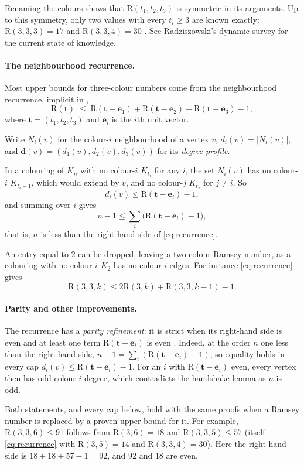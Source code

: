 \documentclass[11pt]{article}
\theoremstyle{spacedplain}
\theoremstyle{spaceddef}
\theoremstyle{spacedremark}
\newcommand{\R}{\mathrm{R}}
\newcommand{\bt}{\mathbf{t}}
\newcommand{\e}{\mathbf{e}}
\begin{document}
Renaming the colours shows that $\R(t_1,t_2,t_3)$ is symmetric in its arguments.
Up to this symmetry, only two values with every $t_i\ge 3$ are known exactly: $\R(3,3,3)=17$ \cite{GG55} and $\R(3,3,4)=30$ \cite{CFIM16}.
See Radziszowski's dynamic survey \cite{Rad26} for the current state of knowledge.

\paragraph{The neighbourhood recurrence.}
Most upper bounds for three-colour numbers come from the neighbourhood recurrence, implicit in \cite{GG55},
\begin{equation}\label{eq:recurrence}
\R(\bt)\;\le\;\R(\bt-\e_1)+\R(\bt-\e_2)+\R(\bt-\e_3)-1,
\end{equation}
where $\bt=(t_1,t_2,t_3)$ and $\e_i$ is the $i$th unit vector.

Write $N_i(v)$ for the colour-$i$ neighbourhood of a vertex $v$, $d_i(v)=|N_i(v)|$, and $\mathbf d(v)=(d_1(v),d_2(v),d_3(v))$ for its \emph{degree profile}.

In a colouring of $K_n$ with no colour-$i$ $K_{t_i}$ for any $i$, the set $N_i(v)$ has no colour-$i$ $K_{t_i-1}$, which would extend by $v$, and no colour-$j$ $K_{t_j}$ for $j\ne i$.
So
\[
d_i(v)\le\R(\bt-\e_i)-1,
\]
and summing over $i$ gives
\[
n-1\le\sum_i\big(\R(\bt-\e_i)-1\big),
\]
that is, $n$ is less than the right-hand side of \eqref{eq:recurrence}.

An entry equal to $2$ can be dropped, leaving a two-colour Ramsey number, as a colouring with no colour-$i$ $K_2$ has no colour-$i$ edges.
For instance \eqref{eq:recurrence} gives
\[
\R(3,3,k)\le 2\R(3,k)+\R(3,3,k-1)-1.
\]

\paragraph{Parity and other improvements.}
The recurrence has a \emph{parity refinement}: it is strict when its right-hand side is even and at least one term $\R(\bt-\e_i)$ is even \cite[6.1(a)]{Rad26}.
Indeed, at the order $n$ one less than the right-hand side, $n-1=\sum_i(\R(\bt-\e_i)-1)$, so equality holds in every cap $d_i(v)\le\R(\bt-\e_i)-1$.
For an $i$ with $\R(\bt-\e_i)$ even, every vertex then has odd colour-$i$ degree, which contradicts the handshake lemma as $n$ is odd.

Both statements, and every cap below, hold with the same proofs when a Ramsey number is replaced by a proven upper bound for it.
For example, $\R(3,3,6)\le 91$ \cite{Rad26,Boz26} follows from $\R(3,6)=18$ and $\R(3,3,5)\le 57$ (itself \eqref{eq:recurrence} with $\R(3,5)=14$ and $\R(3,3,4)=30$).
Here the right-hand side is $18+18+57-1=92$, and $92$ and $18$ are even.
\end{document}
